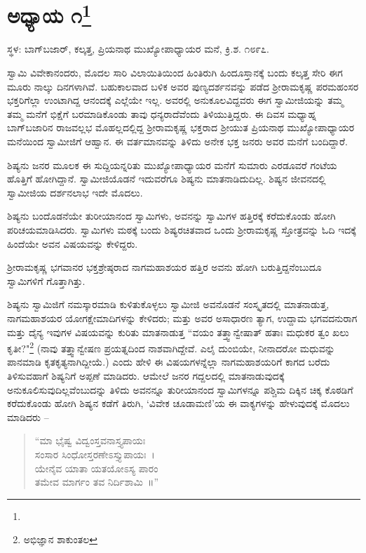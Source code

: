 
\chapter[ಅಧ್ಯಾಯ ೧]{ಅಧ್ಯಾಯ ೧\protect\footnote{}}

\centerline{{\fontsize{11}{13}\selectfont ಸ್ಥಳ: ಬಾಗ್‌ಬಜಾರ್, ಕಲ್ಕತ್ತ, ಪ್ರಿಯನಾಥ ಮುಖ್ಯೋಪಾಧ್ಯಾಯರ ಮನೆ, ಕ್ರಿ.ಶ. ೧೮೯೭.}}

ಸ್ವಾಮಿ ವಿವೇಕಾನಂದರು, ಮೊದಲ ಸಾರಿ ವಿಲಾಯಿತಿಯಿಂದ ಹಿಂತಿರುಗಿ ಹಿಂದೂಸ್ತಾನಕ್ಕೆ ಬಂದು ಕಲ್ಕತ್ತ ಸೇರಿ ಈಗ ಮೂರು ನಾಲ್ಕು ದಿನಗಳಾಗಿವೆ. ಬಹುಕಾಲವಾದ ಬಳಿಕ ಅವರ ಪುಣ್ಯದರ್ಶನವನ್ನು ಪಡೆದ ಶ‍್ರೀರಾಮಕೃಷ್ಣ ಪರಮಹಂಸರ ಭಕ್ತರಿಗೆಲ್ಲಾ ಉಂಟಾಗಿದ್ದ ಆನಂದಕ್ಕೆ ಎಲ್ಲೆಯೇ ಇಲ್ಲ. ಅವರಲ್ಲಿ ಅನುಕೂಲವಿದ್ದವರು ಈಗ ಸ್ವಾಮೀಜಿಯನ್ನು ತಮ್ಮ ತಮ್ಮ ಮನೆಗೆ ಭಿಕ್ಷೆಗೆ ಬರಮಾಡಿಕೊಂಡು ತಾವು ಧನ್ಯರಾದೆವೆಂದು ತಿಳಿಯುತ್ತಿದ್ದರು. ಈ ದಿವಸ ಮಧ್ಯಾಹ್ನ ಬಾಗ್‌ಬಜಾರಿನ ರಾಜವಲ್ಲಭ ಮೊಹಲ್ಲದಲ್ಲಿದ್ದ ಶ‍್ರೀರಾಮಕೃಷ್ಣ ಭಕ್ತರಾದ ಶ‍್ರೀಯುತ ಪ್ರಿಯನಾಥ ಮುಖ್ಯೋಪಾಧ್ಯಾಯರ ಮನೆಯಿಂದ ಸ್ವಾಮೀಜಿಗೆ ಆಹ್ವಾನ. ಈ ವರ್ತಮಾನವನ್ನು ತಿಳಿದು ಅನೇಕ ಭಕ್ತ ಜನರು ಅವರ ಮನೆಗೆ ಬಂದಿದ್ದಾರೆ.

ಶಿಷ್ಯನು ಜನರ ಮೂಲಕ ಈ ಸುದ್ದಿಯನ್ನರಿತು ಮುಖ್ಯೋಪಾಧ್ಯಾಯರ ಮನೆಗೆ ಸುಮಾರು ಎರಡೂವರೆ ಗಂಟೆಯ ಹೊತ್ತಿಗೆ ಹೋಗಿದ್ದಾನೆ. ಸ್ವಾಮೀಜಿಯೊಡನೆ ಇದುವರೆಗೂ ಶಿಷ್ಯನು ಮಾತನಾಡಿದುದಿಲ್ಲ. ಶಿಷ್ಯನ ಜೀವನದಲ್ಲಿ ಸ್ವಾಮೀಜಿಯ ದರ್ಶನಲಾಭ ಇದೇ ಮೊದಲು.

ಶಿಷ್ಯನು ಬಂದೊಡನೆಯೇ ತುರೀಯಾನಂದ ಸ್ವಾಮಿಗಳು, ಅವನನ್ನು ಸ್ವಾಮಿಗಳ ಹತ್ತಿರಕ್ಕೆ ಕರೆದುಕೊಂಡು ಹೋಗಿ ಪರಿಚಯಮಾಡಿಸಿದರು. ಸ್ವಾಮಿಗಳು ಮಠಕ್ಕೆ ಬಂದು ಶಿಷ್ಯರಚಿತವಾದ ಒಂದು ಶ‍್ರೀರಾಮಕೃಷ್ಣ ಸ್ತೋತ್ರವನ್ನು ಓದಿ ಇದಕ್ಕೆ ಹಿಂದೆಯೇ ಅವನ ವಿಷಯವನ್ನು ಕೇಳಿದ್ದರು.

ಶ‍್ರೀರಾಮಕೃಷ್ಣ ಭಗವಾನರ ಭಕ್ತಶ್ರೇಷ್ಠರಾದ ನಾಗಮಹಾಶಯರ ಹತ್ತಿರ ಅವನು ಹೋಗಿ ಬರುತ್ತಿದ್ದನೆಂಬುದೂ ಸ್ವಾಮಿಗಳಿಗೆ ಗೊತ್ತಾಗಿತ್ತು.

ಶಿಷ್ಯನು ಸ್ವಾಮಿಜಿಗೆ ನಮಸ್ಕಾರಮಾಡಿ ಕುಳಿತುಕೊಳ್ಳಲು ಸ್ವಾಮೀಜಿ ಅವನೊಡನೆ ಸಂಸ್ಕೃತದಲ್ಲಿ ಮಾತನಾಡುತ್ತ, ನಾಗಮಹಾಶಯರ ಯೋಗಕ್ಷೇಮಾದಿಗಳನ್ನು ಕೇಳಿದರು; ಮತ್ತು ಅವರ ಅಸಾಧಾರಣ ತ್ಯಾಗ, ಉದ್ದಾಮ ಭಗವದನುರಾಗ ಮತ್ತು ದೈನ್ಯ ಇವುಗಳ ವಿಷಯವನ್ನು ಕುರಿತು ಮಾತನಾಡುತ್ತ “ವಯಂ ತತ್ತ್ವಾನ್ವೇಷಾತ್ ಹತಾಃ ಮಧುಕರ ತ್ವಂ ಖಲು ಕೃತೀ?"\footnote{ಅಭಿಜ್ಞಾನ ಶಾಕುಂತಲ} (ನಾವು ತತ್ತ್ವಾನ್ವೇಷಣ ಪ್ರಯತ್ನದಿಂದ ನಾಶವಾಗಿದ್ದೇವೆ. ಎಲೈ ದುಂಬಿಯೇ, ನೀನಾದರೋ ಮಧುವನ್ನು ಪಾನಮಾಡಿ ಕೃತಕೃತ್ಯನಾಗಿದ್ದೀಯೆ.) ಎಂದು ಹೇಳಿ ಈ ವಿಷಯಗಳನ್ನೆಲ್ಲಾ ನಾಗಮಹಾಶಯರಿಗೆ ಕಾಗದ ಬರೆದು ತಿಳಿಸುವಹಾಗೆ ಶಿಷ್ಯನಿಗೆ ಅಪ್ಪಣೆ ಮಾಡಿದರು. ಆಮೇಲೆ ಜನರ ಗದ್ದಲದಲ್ಲಿ ಮಾತನಾಡುವುದಕ್ಕೆ ಅನುಕೂಲಿಸುವುದಿಲ್ಲವೆಂಬುದನ್ನು ತಿಳಿದು ಅವನನ್ನೂ ತುರೀಯಾನಂದ ಸ್ವಾಮಿಗಳನ್ನೂ ಪಶ್ಚಿಮ ದಿಕ್ಕಿನ ಚಿಕ್ಕ ಕೊಠಡಿಗೆ ಕರೆದುಕೊಂಡು ಹೋಗಿ ಶಿಷ್ಯನ ಕಡೆಗೆ ತಿರುಗಿ, ‘ವಿವೇಕ ಚೂಡಾಮಣಿ’ಯ ಈ ವಾಕ್ಯಗಳನ್ನು ಹೇಳುವುದಕ್ಕೆ ಮೊದಲು ಮಾಡಿದರು –

\begin{verse}
“ಮಾ ಭೈಷ್ವ ವಿದ್ವಂಸ್ತವನಾಸ್ತ್ಯಪಾಯಃ\\ಸಂಸಾರ ಸಿಂಧೋಸ್ತರಣೇಽಸ್ತ್ಯುಪಾಯಃ~।\\ಯೇನೈವ ಯಾತಾ ಯತಯೋಽಸ್ಯ ಪಾರಂ\\ತಮೇವ ಮಾರ್ಗಂ ತವ ನಿರ್ದಿಶಾಮಿ~॥”
\end{verse}

